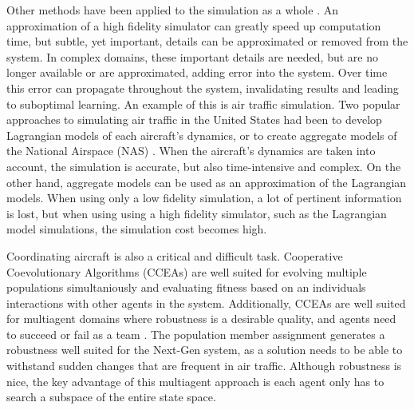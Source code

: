 \documentclass{sig-alternate}
\begin{document}
Other methods have been applied to the simulation as a whole \cite{eps23053}. An approximation of a high fidelity simulator can greatly speed up computation time, but subtle, yet important, details can be approximated or removed from the system. In complex domains, these important details are needed, but are no longer available or are approximated, adding error into the system. Over time this error can propagate throughout the system, invalidating results and leading to suboptimal learning. An example of this is air traffic simulation. Two popular approaches to simulating air traffic in the United States had been to develop Lagrangian models of each aircraft's dynamics, or to create aggregate models of the National Airspace (NAS) \cite{Bertsimas:1998:ATF:767667.768027, McNally, Mueller_analysisof}. When the aircraft's dynamics are taken into account, the simulation is accurate, but also time-intensive and complex. On the other hand, aggregate models can be used as an approximation of the Lagrangian models. When using only a low fidelity simulation, a lot of pertinent information is lost, but when using using a high fidelity simulator, such as the Lagrangian model simulations, the simulation cost becomes high.

Coordinating aircraft is also a critical and difficult task.  Cooperative Coevolutionary Algorithms (CCEAs) are well suited for evolving multiple populations simultaniously and evaluating fitness based on an individuals interactions with other agents in the system. Additionally, CCEAs are well suited for multiagent domains where robustness is a desirable quality, and agents need to succeed or fail as a team \cite{Panait:2005:CML:1090749.1090753}. The population member assignment generates a robustness well suited for the Next-Gen system, as a solution needs to be able to withstand sudden changes that are frequent in air traffic. Although robustness is nice, the key advantage of this multiagent approach is each agent only has to search a subspace of the entire state space.

\end{document}
